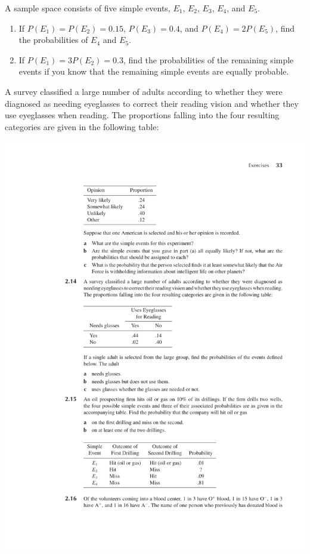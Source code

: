 \documentclass[12pt,reqno]{amsart}
\begin{document}
\prob A sample space consists of five simple events, $E_1$, $E_2$, $E_3$, $E_4$, and $E_5$.

\medskip
\begin{enumerate}
    \item If $P(E_1) = P(E_2) = 0.15$, $P(E_3) = 0.4$, and $P(E_4) = 2P(E_5)$, find the probabilities of $E_4$ and $E_5$.\vfill
    


    \item If $P(E_1) = 3P(E_2) = 0.3$, find the probabilities of the remaining simple events if you know that the remaining simple events are equally probable.\vfill
    

    
\end{enumerate}















\newpage
\prob A survey classified a large number of adults according to whether they were diagnosed as needing eyeglasses to correct their reading vision and whether they use eyeglasses when reading. The proportions falling into the four resulting categories are given in the following table:

\medskip
\begin{center}
\includegraphics[scale=1]{img.pdf}
\end{center}
\medskip
\end{document}

